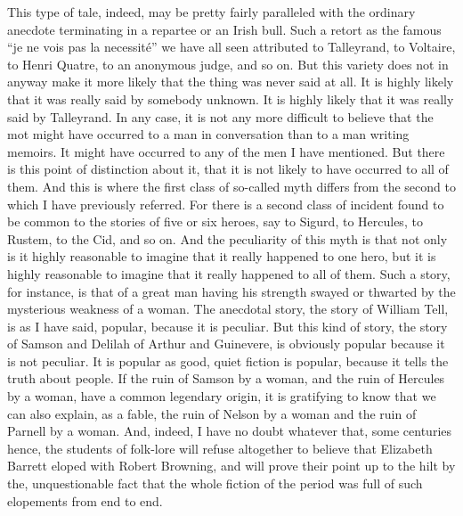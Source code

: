 This type of tale, indeed, may be pretty fairly paralleled with the ordinary anecdote terminating in a repartee or an Irish bull. Such a retort as the famous “je ne vois pas la necessité” we have all seen attributed to Talleyrand, to Voltaire, to Henri Quatre, to an anonymous judge, and so on. But this variety does not in anyway make it more likely that the thing was never said at all. It is highly likely that it was really said by somebody unknown. It is highly likely that it was really said by Talleyrand. In any case, it is not any more difficult to believe that the mot might have occurred to a man in conversation than to a man writing memoirs. It might have occurred to any of the men I have mentioned. But there is this point of distinction about it, that it is not likely to have occurred to all of them. And this is where the first class of so-called myth differs from the second to which I have previously referred. For there is a second class of incident found to be common to the stories of five or six heroes, say to Sigurd, to Hercules, to Rustem, to the Cid, and so on. And the peculiarity of this myth is that not only is it highly reasonable to imagine that it really happened to one hero, but it is highly reasonable to imagine that it really happened to all of them. Such a story, for instance, is that of a great man having his strength swayed or thwarted by the mysterious weakness of a woman. The anecdotal story, the story of William Tell, is as I have said, popular, because it is peculiar. But this kind of story, the story of Samson and Delilah of Arthur and Guinevere, is obviously popular because it is not peculiar. It is popular as good, quiet fiction is popular, because it tells the truth about people. If the ruin of Samson by a woman, and the ruin of Hercules by a woman, have a common legendary origin, it is gratifying to know that we can also explain, as a fable, the ruin of Nelson by a woman and the ruin of Parnell by a woman. And, indeed, I have no doubt whatever that, some centuries hence, the students of folk-lore will refuse altogether to believe that Elizabeth Barrett eloped with Robert Browning, and will prove their point up to the hilt by the, unquestionable fact that the whole fiction of the period was full of such elopements from end to end.


